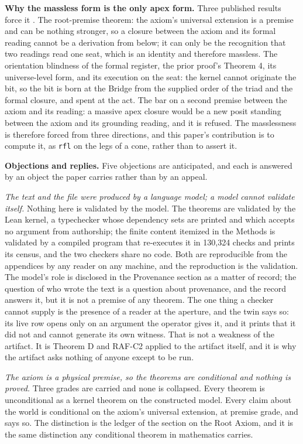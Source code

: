 \documentclass[10pt]{article}
\begin{document}
\textbf{Why the massless form is the only apex form.} Three published
results force it \cite{islamcodex, islamraf}. The root-premise theorem:
the axiom's universal extension is a premise and can be nothing
stronger, so a closure between the axiom and its formal reading cannot
be a derivation from below; it can only be the recognition that two
readings read one seat, which is an identity and therefore massless. The
orientation blindness of the formal register, the prior proof's Theorem
4, its universe-level form, and its execution on the seat: the kernel
cannot originate the bit, so the bit is born at the Bridge from the
supplied order of the triad and the formal closure, and spent at the
act. The bar on a second premise between the axiom and its reading: a
massive apex closure would be a new posit standing between the axiom and
its grounding reading, and it is refused. The masslessness is therefore
forced from three directions, and this paper's contribution is to
compute it, as \texttt{rfl} on the legs of a cone, rather than to assert
it.

\textbf{Objections and replies.} Five objections are anticipated, and
each is answered by an object the paper carries rather than by an
appeal.

\emph{The text and the file were produced by a language model; a model
cannot validate itself.} Nothing here is validated by the model. The
theorems are validated by the Lean kernel, a typechecker whose
dependency sets are printed and which accepts no argument from
authorship; the finite content itemized in the Methods is validated by a
compiled program that re-executes it in 130,324 checks and prints its
census, and the two checkers share no code. Both are reproducible from
the appendices by any reader on any machine, and the reproduction is the
validation. The model's role is disclosed in the Provenance section as a
matter of record; the question of who wrote the text is a question about
provenance, and the record answers it, but it is not a premise of any
theorem. The one thing a checker cannot supply is the presence of a
reader at the aperture, and the twin says so: its live row opens only on
an argument the operator gives it, and it prints that it did not and
cannot generate its own witness. That is not a weakness of the artifact.
It is Theorem D and RAF-C2 applied to the artifact itself, and it is why
the artifact asks nothing of anyone except to be run.

\emph{The axiom is a physical premise, so the theorems are conditional
and nothing is proved.} Three grades are carried and none is collapsed.
Every theorem is unconditional as a kernel theorem on the constructed
model. Every claim about the world is conditional on the axiom's
universal extension, at premise grade, and says so. The distinction is
the ledger of the section on the Root Axiom, and it is the same
distinction any conditional theorem in mathematics carries.
\end{document}
